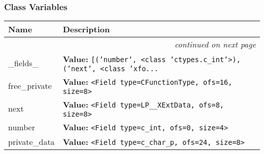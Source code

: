 
  \subsubsection{Class Variables}

    \vspace{-1cm}
\hspace{\varindent}\begin{longtable}{|p{\varnamewidth}|p{\vardescrwidth}|l}
\cline{1-2}
\cline{1-2} \centering \textbf{Name} & \centering \textbf{Description}& \\
\cline{1-2}
\endhead\cline{1-2}\multicolumn{3}{r}{\small\textit{continued on next page}}\\\endfoot\cline{1-2}
\endlastfoot\raggedright \_\-f\-i\-e\-l\-d\-s\-\_\- & \raggedright \textbf{Value:} 
{\tt \texttt{[}\texttt{(}\texttt{'}\texttt{number}\texttt{'}\texttt{, }{\textless}class 'ctypes.c\_int'{\textgreater}\texttt{)}\texttt{, }\texttt{(}\texttt{'}\texttt{next}\texttt{'}\texttt{, }{\textless}class 'xfo\texttt{...}}&\\
\cline{1-2}
\raggedright f\-r\-e\-e\-\_\-p\-r\-i\-v\-a\-t\-e\- & \raggedright \textbf{Value:} 
{\tt {\textless}Field type=CFunctionType, ofs=16, size=8{\textgreater}}&\\
\cline{1-2}
\raggedright n\-e\-x\-t\- & \raggedright \textbf{Value:} 
{\tt {\textless}Field type=LP\_\_XExtData, ofs=8, size=8{\textgreater}}&\\
\cline{1-2}
\raggedright n\-u\-m\-b\-e\-r\- & \raggedright \textbf{Value:} 
{\tt {\textless}Field type=c\_int, ofs=0, size=4{\textgreater}}&\\
\cline{1-2}
\raggedright p\-r\-i\-v\-a\-t\-e\-\_\-d\-a\-t\-a\- & \raggedright \textbf{Value:} 
{\tt {\textless}Field type=c\_char\_p, ofs=24, size=8{\textgreater}}&\\
\cline{1-2}
\end{longtable}




